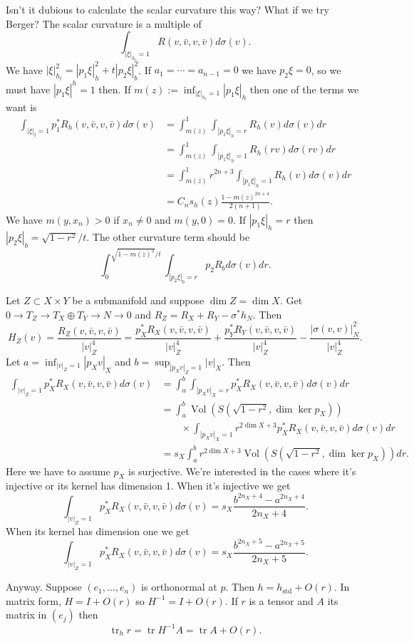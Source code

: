 \documentclass[10pt,a4paper]{amsart}
\DeclareMathOperator{\Vol}{Vol}
\DeclareMathOperator{\tr}{tr}
\begin{document}
Isn't it dubious to calculate the scalar curvature this way?
What if we try Berger?
The scalar curvature is a multiple of
$$
\int_{|\xi|_{h_t}=1} R(v,\bar v,v,\bar v) d\sigma(v).
$$
We have $|\xi|^2_{h_t} = |p_1\xi|^2_h + t |p_2\xi|^2_b$.
If $a_1 = \cdots = a_{n-1} = 0$ we have $p_2\xi = 0$, so we must have
$|p_1 \xi|^h = 1$ then.
If $m(z) := \inf_{|\xi|_{h_t}=1} |p_1\xi|_h$ then
one of the terms we want is
\begin{align*}
\int_{|\xi|_t=1} p_1^*R_h(v,\bar v,v,\bar v) d\sigma(v)
&= \int_{m(z)}^1 \int_{|p_1\xi|_h=r} R_h(v) d\sigma(v)dr
\\
&= \int_{m(z)}^1 \int_{|p_1\xi|_h=1} R_h(rv) d\sigma(rv) dr
\\
&= \int_{m(z)}^1 r^{2n+3} \int_{|p_1\xi|_h=1} R_h(v) d\sigma(v) dr
\\
&= C_n s_h(z) \frac{1 - m(z)^{2n+4}}{2(n+1)}.
\end{align*}
We have $m(y,x_n) > 0$ if $x_n \not= 0$ and $m(y,0) = 0$.
If $|p_1\xi|_h = r$ then $|p_2\xi|_b = \sqrt{1 - r^2}/t$.
The other curvature term should be
$$
\int_0^{\sqrt{1-m(z)^2}/t}
\int_{|p_2\xi|_b=r} p_2 R_b d\sigma(v) dr.
$$

Let $Z \subset X \times Y$ be a submanifold
and suppose $\dim Z = \dim X$.
Get $0 \to T_Z \to T_X \oplus T_Y \to N \to 0$ and $R_Z = R_{X} + R_Y - \sigma^* h_N$.
Then
$$
H_Z(v)
= \frac{R_Z(v,\bar v,v, \bar v)}{|v|_Z^4}
= \frac{p_X^* R_X(v,\bar v,v, \bar v)}{|v|_Z^4}
+ \frac{p_Y^* R_Y(v,\bar v,v, \bar v)}{|v|_Z^4}
- \frac{|\sigma(v,v)|^2_N}{|v|_Z^4}.
$$
Let $a = \inf_{|v|_Z=1} |p_X v|_X$ and $b = \sup_{|p_X v|_Z=1} |v|_X$.
Then
\begin{align*}
\int_{|v|_Z=1}
p_X^* R_X(v,\bar v,v, \bar v)
d\sigma(v)
&= \int_a^b \int_{|p_X v|_X=r} p_X^*R_X(v,\bar v,v,\bar v) d\sigma(v)dr
\\
&= \int_a^b \Vol(S(\sqrt{1-r^2}, \dim\ker p_X))
\\
&\qquad
\times
\int_{|p_X v|_X=1} r^{2\dim X+3} p_X^*R_X(v,\bar v,v,\bar v) d\sigma(v) dr
\\
&= s_X \int_a^b r^{2\dim X + 3} \Vol(S(\sqrt{1-r^2}, \dim\ker p_X)) dr.
\end{align*}
Here we have to assume $p_X$ is surjective.
We're interested in the cases where it's injective or its kernel has dimension 1.
When it's injective we get
$$
\int_{|v|_Z=1} p_X^* R_X(v,\bar v,v, \bar v) d\sigma(v)
= s_X \frac{b^{2n_X+4} - a^{2n_X+4}}{2n_X+4}.
$$
When its kernel has dimension one we get
$$
\int_{|v|_Z=1} p_X^* R_X(v,\bar v,v, \bar v) d\sigma(v)
= s_X \frac{b^{2n_X+5} - a^{2n_X+5}}{2n_X+5}.
$$


Anyway.
Suppose $(e_1,\ldots,e_n)$ is orthonormal at $p$.
Then $h = h_{\mathrm{std}} + O(r)$.
In matrix form, $H = I + O(r)$ so $H^{-1} = I + O(r)$.
If $r$ is a tensor and $A$ its matrix in $(e_j)$ then
$$
\tr_h r
= \tr H^{-1} A
= \tr A + O(r).
$$






\end{document}

